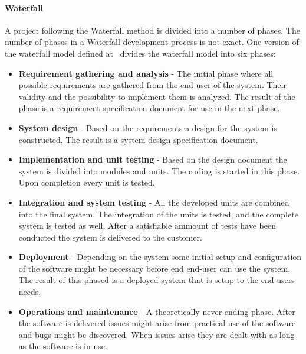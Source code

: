 \paragraph{Waterfall}
A project following the Waterfall method is divided into a number of phases.
The number of phases in a Waterfall development process is not exact.
One version of the waterfall model defined at~\citep{Parekh11} divides the waterfall model into six phases:

\begin{itemize}
	\item \textbf{Requirement gathering and analysis} - The initial phase where all possible requirements are gathered from the end-user of the system. Their validity and the possibility to implement them is analyzed. The result of the phase is a requirement specification document for use in the next phase.
	\item \textbf{System design} - Based on the requirements a design for the system is constructed. The result is a system design specification document.
	\item \textbf{Implementation and unit testing} - Based on the design document the system is divided into modules and units. The coding is started in this phase. Upon completion every unit is tested.
	\item \textbf{Integration and system testing} - All the developed units are combined into the final system. The integration of the units is tested, and the complete system is tested as well. After a satisfiable ammount of tests have been conducted the system is delivered to the customer.
	\item \textbf{Deployment} - Depending on the system some initial setup and configuration of the software might be necessary before end end-user can use the system. The result of this phased is a deployed system that is setup to the end-users needs.
	\item \textbf{Operations and maintenance} - A theoretically never-ending phase. After the software is delivered issues might arise from practical use of the software and bugs might be discovered. When issues arise they are dealt with as long as the software is in use.
\end{itemize}

